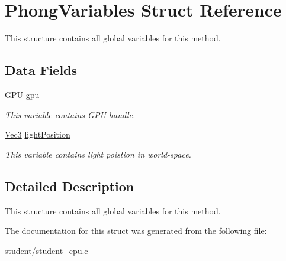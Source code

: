 \hypertarget{structPhongVariables}{\section{Phong\-Variables Struct Reference}
\label{structPhongVariables}
}


This structure contains all global variables for this method.  


\subsection*{Data Fields}
\begin{DoxyCompactItemize}
\item 
\hypertarget{structPhongVariables_a21952c475e05b5a507b05527459cfcb4}{\hyperlink{fwd_8h_a06964ec111fe28721d8618b6d0d993bf}{G\-P\-U} \hyperlink{structPhongVariables_a21952c475e05b5a507b05527459cfcb4}{gpu}}\label{structPhongVariables_a21952c475e05b5a507b05527459cfcb4}

\begin{DoxyCompactList}\small\item\em This variable contains G\-P\-U handle. \end{DoxyCompactList}\item 
\hypertarget{structPhongVariables_aab37c6c27bf6eac7d326a34afb74c90c}{\hyperlink{structVec3}{Vec3} \hyperlink{structPhongVariables_aab37c6c27bf6eac7d326a34afb74c90c}{light\-Position}}\label{structPhongVariables_aab37c6c27bf6eac7d326a34afb74c90c}

\begin{DoxyCompactList}\small\item\em This variable contains light poistion in world-\/space. \end{DoxyCompactList}\end{DoxyCompactItemize}


\subsection{Detailed Description}
This structure contains all global variables for this method. 

The documentation for this struct was generated from the following file\-:\begin{DoxyCompactItemize}
\item 
student/\hyperlink{student__cpu_8c}{student\-\_\-cpu.\-c}\end{DoxyCompactItemize}
